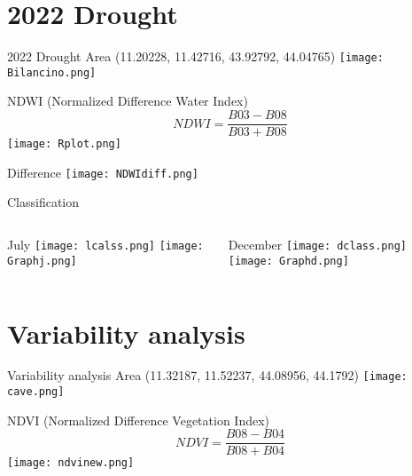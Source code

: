 \documentclass{beamer}
\begin{document}
\section{2022 Drought}


\begin{frame}{2022 Drought}
     \centering
     Area (11.20228, 11.42716, 43.92792, 44.04765)
    \texttt{[image: Bilancino.png]}
\end{frame}

\begin{frame}{NDWI (Normalized Difference Water Index) }
     \centering
     \begin{equation}
        NDWI = \frac{B03 - B08}{B03 +B08}
     \end{equation}
    \texttt{[image: Rplot.png]}
\end{frame}

\begin{frame}{Difference }
     \centering
    \texttt{[image: NDWIdiff.png]}
\end{frame}

\begin{frame}{Classification}
    \centering
    \begin{columns}
        \centering
        July
        \smallskip
        \texttt{[image: lcalss.png]}
        \texttt{[image: Graphj.png]}
         
        \centering
        December
        \smallskip
        \texttt{[image: dclass.png]}
        \texttt{[image: Graphd.png]}
    \end{columns} 
\end{frame}


\section{Variability analysis}


\begin{frame}{Variability analysis}
     \centering
     Area (11.32187, 11.52237, 44.08956, 44.1792)
    \texttt{[image: cave.png]}
\end{frame}

 \begin{frame}{NDVI (Normalized Difference Vegetation Index) }
     \centering
     \begin{equation}
        NDVI = \frac{B08 - B04}{B08 + B04}
     \end{equation}
     \smallskip
    \texttt{[image: ndvinew.png]}
\end{frame}
\end{document}
